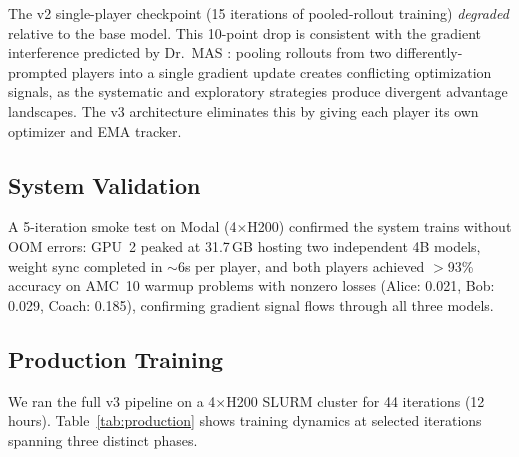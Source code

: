 \documentclass{article}
\begin{document}
The v2 single-player checkpoint (15 iterations of pooled-rollout training) \emph{degraded} relative to the base model. This 10-point drop is consistent with the gradient interference predicted by Dr.~MAS \citep{zhu2025drmas}: pooling rollouts from two differently-prompted players into a single gradient update creates conflicting optimization signals, as the systematic and exploratory strategies produce divergent advantage landscapes. The v3 architecture eliminates this by giving each player its own optimizer and EMA tracker.

\subsection{System Validation}

A 5-iteration smoke test on Modal (4$\times$H200) confirmed the system trains without OOM errors: GPU~2 peaked at 31.7\,GB hosting two independent 4B models, weight sync completed in ${\sim}6$s per player, and both players achieved $>$93\% accuracy on AMC~10 warmup problems with nonzero losses (Alice: 0.021, Bob: 0.029, Coach: 0.185), confirming gradient signal flows through all three models.

\subsection{Production Training}

We ran the full v3 pipeline on a 4$\times$H200 SLURM cluster for 44 iterations (12 hours). Table~\ref{tab:production} shows training dynamics at selected iterations spanning three distinct phases.
\end{document}
